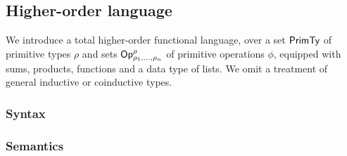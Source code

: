 \subsection{Higher-order language}

We introduce a total higher-order functional language, over a set $\mathsf{PrimTy}$ of primitive types $\rho$ and sets
$\mathsf{Op}^\rho_{\rho_1,\ldots,\rho_n}$ of primitive operations $\phi$, equipped with sums, products, functions
and a data type of lists. We omit a treatment of general inductive or coinductive types.

\subsubsection{Syntax}
\label{sec:language:syntax}


% 


\subsubsection{Semantics}
\label{sec:language:semantics}

% 
% 
%
%
